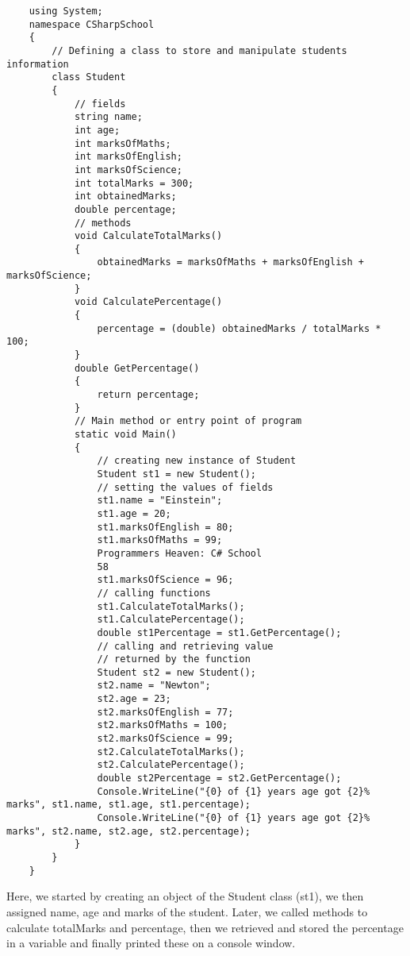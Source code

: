 \begin{lstlisting}
    using System;
    namespace CSharpSchool
    {
        // Defining a class to store and manipulate students information
        class Student
        {
            // fields
            string name;
            int age;
            int marksOfMaths;
            int marksOfEnglish;
            int marksOfScience;
            int totalMarks = 300;
            int obtainedMarks;
            double percentage;
            // methods
            void CalculateTotalMarks()
            {
                obtainedMarks = marksOfMaths + marksOfEnglish + marksOfScience;
            }
            void CalculatePercentage()
            {
                percentage = (double) obtainedMarks / totalMarks * 100;
            }
            double GetPercentage()
            {
                return percentage;
            }
            // Main method or entry point of program
            static void Main()
            {
                // creating new instance of Student
                Student st1 = new Student();
                // setting the values of fields
                st1.name = "Einstein";
                st1.age = 20;
                st1.marksOfEnglish = 80;
                st1.marksOfMaths = 99;
                Programmers Heaven: C# School
                58
                st1.marksOfScience = 96;
                // calling functions
                st1.CalculateTotalMarks();
                st1.CalculatePercentage();
                double st1Percentage = st1.GetPercentage();
                // calling and retrieving value
                // returned by the function
                Student st2 = new Student();
                st2.name = "Newton";
                st2.age = 23;
                st2.marksOfEnglish = 77;
                st2.marksOfMaths = 100;
                st2.marksOfScience = 99;
                st2.CalculateTotalMarks();
                st2.CalculatePercentage();
                double st2Percentage = st2.GetPercentage();
                Console.WriteLine("{0} of {1} years age got {2}% marks", st1.name, st1.age, st1.percentage);
                Console.WriteLine("{0} of {1} years age got {2}% marks", st2.name, st2.age, st2.percentage);
            }
        }
    }    
\end{lstlisting}

Here, we started by creating an object of the Student class (st1), we then assigned name, age and marks of the
student. Later, we called methods to calculate totalMarks and percentage, then we retrieved and stored the
percentage in a variable and finally printed these on a console window.\\

